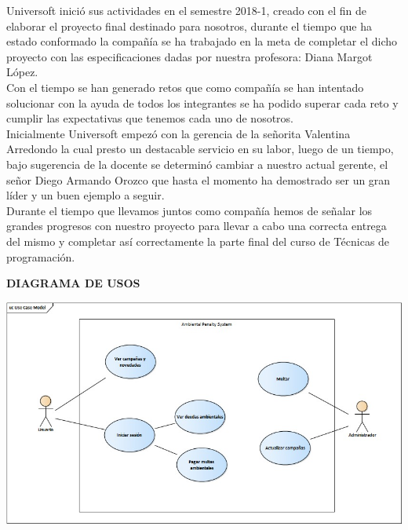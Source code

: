 \documentclass[12pt]{article}
\begin{document}
{Universoft inició sus actividades en el semestre 2018-1, creado con el fin de elaborar el proyecto final destinado para nosotros, durante el tiempo que ha estado conformado la compañía se ha trabajado en la meta de completar el dicho proyecto con las especificaciones dadas por nuestra profesora: Diana Margot López.\\
Con el tiempo se han generado retos que como compañía se han intentado solucionar con la ayuda de todos los integrantes se ha podido superar cada reto y cumplir las expectativas que tenemos cada uno de nosotros.\\
Inicialmente Universoft empezó con la gerencia de la señorita Valentina Arredondo la cual presto un destacable servicio en su labor, luego de un tiempo, bajo sugerencia de la docente se determinó cambiar a nuestro actual gerente, el señor Diego Armando Orozco que hasta el momento ha demostrado ser un gran líder y un buen ejemplo a seguir.\\
Durante el tiempo que llevamos juntos como compañía hemos de señalar los grandes progresos con nuestro proyecto para llevar a cabo una correcta entrega del mismo y completar así correctamente la parte final del curso de Técnicas de programación.\\
\newpage

\begin{center}
\textbf{\Large DIAGRAMA DE USOS\\}
\end{center}

\begin{center}
\includegraphics[scale=0.5]{DIAGRAMuSOS.jpg} 
\end{center}

}
\end{document}
